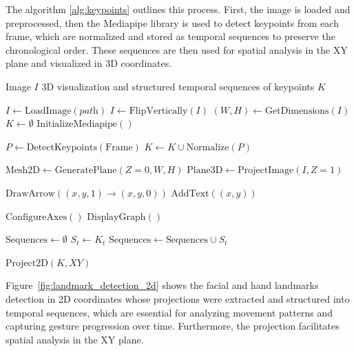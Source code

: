 \documentclass[preprint,12pt,authoryear]{elsarticle}
\begin{document}
\begin{enumerate}
The algorithm \ref{alg:keypoints} outlines this process. First, the image is loaded and preprocessed, then the Mediapipe library is used to detect keypoints from each frame, which are normalized and stored as temporal sequences to preserve the chronological order. These sequences are then used for spatial analysis in the XY plane and visualized in 3D coordinates.

\begin{algorithm}[hbt!]
\caption{Keypoints $\rightarrow$ 3D Visualization and Temporal Structuring}\label{alg:keypoints}
\begin{algorithmic}[1]
\Require Image $I$
\Ensure 3D visualization and structured temporal sequences of keypoints $K$

\State $I \gets \text{LoadImage}(\textit{path})$
\State $I \gets \text{FlipVertically}(I)$
\State $(W, H) \gets \text{GetDimensions}(I)$
\State $K \gets \emptyset$ 
\State $\text{InitializeMediapipe}()$

    \State $P \gets \text{DetectKeypoints}(\text{Frame})$
    \State $K \gets K \cup \text{Normalize}(P)$
\EndWhile

\State $\text{Mesh2D} \gets \text{GeneratePlane}(Z=0, W, H)$
\State $\text{Plane3D} \gets \text{ProjectImage}(I, Z=1)$

    \State $\text{DrawArrow}((x, y, 1) \rightarrow (x, y, 0))$
    \State $\text{AddText}((x, y))$
\EndFor

\State $\text{ConfigureAxes}()$
\State $\text{DisplayGraph}()$

\State $\text{Sequences} \gets \emptyset$ 
    \State $S_t \gets K_t$ 
    \State $\text{Sequences} \gets \text{Sequences} \cup S_t$ 
\EndFor

\State $\text{Project2D}(K, XY)$ 

\end{algorithmic}
\end{algorithm}

\newpage
Figure~\ref{fig:landmark_detection_2d} shows the facial and hand landmarks detection in 2D coordinates whose projections were extracted and structured into temporal sequences, which are essential for analyzing movement patterns and capturing gesture progression over time. Furthermore, the projection facilitates spatial analysis in the XY plane.


\end{enumerate}
\end{document}
